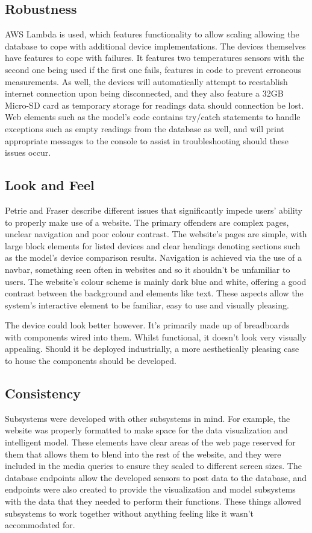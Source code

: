\documentclass[]{report}
\begin{document}
	\subsection{Robustness}
	AWS Lambda is used, which features functionality to allow scaling\cite{awslambdadocs} allowing the database to cope with additional device implementations. The devices themselves have features to cope with failures. It features two temperatures sensors with the second one being used if the first one fails, features in code to prevent erroneous measurements. As well, the devices will automatically attempt to reestablish internet connection upon being disconnected, and they also feature a 32GB Micro-SD card as temporary storage for readings data should connection be lost. Web elements such as the model's code contains try/catch statements to handle exceptions such as empty readings from the database as well, and will print appropriate messages to the console to assist in troubleshooting should these issues occur.
	
	\subsection{Look and Feel}
	Petrie and Fraser\cite{petrie2004tension} describe different issues that significantly impede users' ability to properly make use of a website. The primary offenders are complex pages, unclear navigation and poor colour contrast. The website's pages are simple, with large block elements for listed devices and clear headings denoting sections such as the model's device comparison results. Navigation is achieved via the use of a navbar, something seen often in websites and so it shouldn't be unfamiliar to users. The website's colour scheme is mainly dark blue and white, offering a good contrast between the background and elements like text. These aspects allow the system's interactive element to be familiar, easy to use and visually pleasing.
	
	The device could look better however. It's primarily made up of breadboards with components wired into them. Whilst functional, it doesn't look very visually appealing. Should it be deployed industrially, a more aesthetically pleasing case to house the components should be developed.
	
	\subsection{Consistency}
	Subsystems were developed with other subsystems in mind. For example, the website was properly formatted to make space for the data visualization and intelligent model. These elements have clear areas of the web page reserved for them that allows them to blend into the rest of the website, and they were included in the media queries to ensure they scaled to different screen sizes. The database endpoints allow the developed sensors to post data to the database, and endpoints were also created to provide the visualization and model subsystems with the data that they needed to perform their functions. These things allowed subsystems to work together without anything feeling like it wasn't accommodated for.
	
\end{document}
